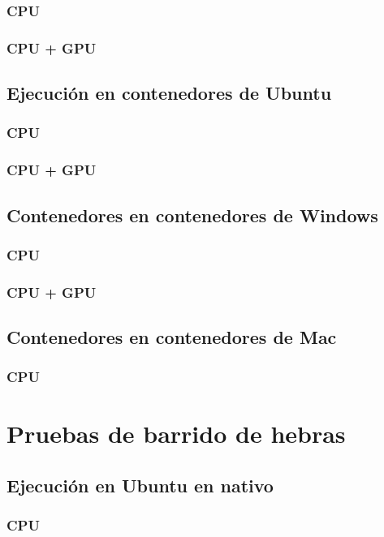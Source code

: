 \subsubsection{CPU}

\subsubsection{CPU + GPU}

\subsection{Ejecución en contenedores de Ubuntu}
\subsubsection{CPU}

\subsubsection{CPU + GPU}

\subsection{Contenedores en contenedores de Windows}
\subsubsection{CPU}

\subsubsection{CPU + GPU}

\subsection{Contenedores en contenedores de Mac}
\subsubsection{CPU}

\section{Pruebas de barrido de hebras}
\subsection{Ejecución en Ubuntu en nativo}
\subsubsection{CPU}

